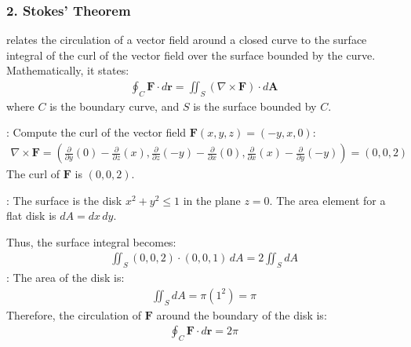 \documentclass[letterpaper,10pt,english]{jupyterBook}
\begin{document}
\subsubsection{2. Stokes’ Theorem}
\label{\detokenize{prerequisites:stokes-theorem}}
\sphinxAtStartPar
{} relates the circulation of a vector field around a closed curve to the surface integral of the curl of the vector field over the surface bounded by the curve. Mathematically, it states:
\begin{equation*}
\begin{split}
\oint_C \mathbf{F} \cdot d\mathbf{r} = \iint_S (\nabla \times \mathbf{F}) \cdot d\mathbf{A}
\end{split}
\end{equation*}
\sphinxAtStartPar
where \( C \) is the boundary curve, and \( S \) is the surface bounded by \( C \).

\sphinxAtStartPar
{}: Compute the curl of the vector field \( \mathbf{F}(x, y, z) = (-y, x, 0) \):
\begin{equation*}
\begin{split}
\nabla \times \mathbf{F} = \left( \frac{\partial}{\partial y}(0) - \frac{\partial}{\partial z}(x), \frac{\partial}{\partial z}(-y) - \frac{\partial}{\partial x}(0), \frac{\partial}{\partial x}(x) - \frac{\partial}{\partial y}(-y) \right) = (0, 0, 2)
\end{split}
\end{equation*}
\sphinxAtStartPar
The curl of \( \mathbf{F} \) is \( (0, 0, 2) \).

\sphinxAtStartPar
{}: The surface is the disk \( x^2 + y^2 \leq 1 \) in the plane \( z = 0 \). The area element for a flat disk is \( dA = dx \, dy \).

\sphinxAtStartPar
Thus, the surface integral becomes:
\begin{equation*}
\begin{split}
\iint_S (0, 0, 2) \cdot (0, 0, 1) \, dA = 2 \iint_S dA
\end{split}
\end{equation*}
\sphinxAtStartPar
{}: The area of the disk is:
\begin{equation*}
\begin{split}
\iint_S dA = \pi (1^2) = \pi
\end{split}
\end{equation*}
\sphinxAtStartPar
Therefore, the circulation of \( \mathbf{F} \) around the boundary of the disk is:
\begin{equation*}
\begin{split}
\oint_C \mathbf{F} \cdot d\mathbf{r} = 2\pi
\end{split}
\end{equation*}
\end{document}
